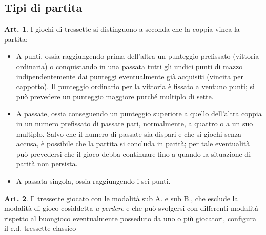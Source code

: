 \documentclass[italian,a4paper]{article}
\theoremstyle{definition}
\newtheorem{art}{Art.}
\begin{document}
\subsection{Tipi di partita}
\begin{art}
I giochi di tressette si distinguono a seconda che la coppia vinca la partita:
\begin{itemize}
\item      A punti, ossia raggiungendo prima dell'altra un punteggio prefissato (vittoria ordinaria) o conquistando in una passata tutti gli undici punti di mazzo indipendentemente dai punteggi eventualmente già acquisiti (vincita per cappotto). Il punteggio ordinario per la vittoria è fissato a ventuno punti; si può prevedere un punteggio maggiore purché multiplo di sette.
\item     A passate, ossia conseguendo un punteggio superiore a quello dell'altra coppia in un numero prefissato di passate pari, normalmente, a quattro o a un suo multiplo. Salvo che il numero di passate sia dispari e che si giochi senza accusa, è possibile che la partita si concluda in parità; per tale eventualità può prevedersi che il gioco debba continuare fino a quando la situazione di parità non persista.
\item     A passata singola, ossia raggiungendo i sei punti.
    \end{itemize}
\end{art}
\begin{art}
Il tressette giocato con le modalità sub A. e sub B., che esclude la modalità di gioco cosiddetta \emph{a perdere}  e che può svolgersi con differenti modalità rispetto al buongioco eventualmente posseduto da uno o più giocatori, configura il c.d. tressette classico
\end{art}
\end{document}
